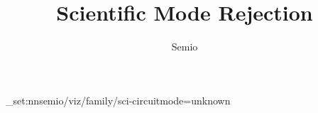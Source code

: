 \documentclass[type=paper,language=de,theme=dark]{semio}
\title{Scientific Mode Rejection}
\author{Semio}
\date{}
\begin{document}
\SemioVizProbePage
\ExplSyntaxOn\keys_set:nn{semio/viz/family/sci-circuit}{mode=unknown}\ExplSyntaxOff
{}
\SemioVizProbeEnd
\end{document}

